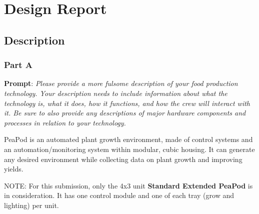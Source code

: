 \documentclass{report}
\begin{document}
\section{Design Report}

\subsection{Description}
\label{sec:description}

\subsubsection{Part A}
\label{sec:description-a}

\textbf{Prompt}: \textit{Please provide a more fulsome description of your food production technology. Your description needs to include information about what the technology is, what it does, how it functions, and how the crew will interact with it. Be sure to also provide any descriptions of major hardware components and processes in relation to your technology.}

PeaPod is an automated plant growth environment, made of control systems and an automation/monitoring system within modular, cubic housing. It can generate any desired environment while collecting data on plant growth and improving yields.

NOTE: For this submission, only the 4x3 unit \textbf{Standard Extended PeaPod} is in consideration. It has one control module and one of each tray (grow and lighting) per unit.
\end{document}
